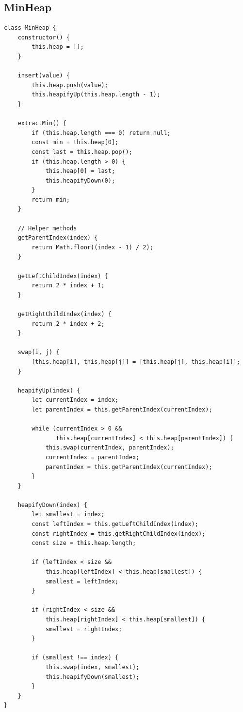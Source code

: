 \documentclass{article}
\begin{document}
\subsection{MinHeap}
\begin{lstlisting}
class MinHeap {
    constructor() {
        this.heap = [];
    }
    
    insert(value) {
        this.heap.push(value);
        this.heapifyUp(this.heap.length - 1);
    }
    
    extractMin() {
        if (this.heap.length === 0) return null;
        const min = this.heap[0];
        const last = this.heap.pop();
        if (this.heap.length > 0) {
            this.heap[0] = last;
            this.heapifyDown(0);
        }
        return min;
    }
    
    // Helper methods
    getParentIndex(index) {
        return Math.floor((index - 1) / 2);
    }
    
    getLeftChildIndex(index) {
        return 2 * index + 1;
    }
    
    getRightChildIndex(index) {
        return 2 * index + 2;
    }
    
    swap(i, j) {
        [this.heap[i], this.heap[j]] = [this.heap[j], this.heap[i]];
    }
    
    heapifyUp(index) {
        let currentIndex = index;
        let parentIndex = this.getParentIndex(currentIndex);
        
        while (currentIndex > 0 && 
               this.heap[currentIndex] < this.heap[parentIndex]) {
            this.swap(currentIndex, parentIndex);
            currentIndex = parentIndex;
            parentIndex = this.getParentIndex(currentIndex);
        }
    }
    
    heapifyDown(index) {
        let smallest = index;
        const leftIndex = this.getLeftChildIndex(index);
        const rightIndex = this.getRightChildIndex(index);
        const size = this.heap.length;
        
        if (leftIndex < size && 
            this.heap[leftIndex] < this.heap[smallest]) {
            smallest = leftIndex;
        }
        
        if (rightIndex < size && 
            this.heap[rightIndex] < this.heap[smallest]) {
            smallest = rightIndex;
        }
        
        if (smallest !== index) {
            this.swap(index, smallest);
            this.heapifyDown(smallest);
        }
    }
}
\end{lstlisting}
\end{document}

